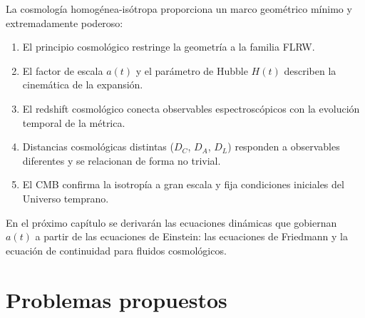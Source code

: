 La cosmología homogénea-isótropa proporciona un marco geométrico mínimo y extremadamente poderoso:
\begin{enumerate}[leftmargin=2em, label=\textbf{\arabic*.}]
  \item El principio cosmológico restringe la geometría a la familia FLRW.
  \item El factor de escala $a(t)$ y el parámetro de Hubble $H(t)$ describen la cinemática de la expansión.
  \item El redshift cosmológico conecta observables espectroscópicos con la evolución temporal de la métrica.
  \item Distancias cosmológicas distintas ($D_C$, $D_A$, $D_L$) responden a observables diferentes y se relacionan de forma no trivial.
  \item El CMB confirma la isotropía a gran escala y fija condiciones iniciales del Universo temprano.
\end{enumerate}

En el próximo capítulo se derivarán las ecuaciones dinámicas que gobiernan $a(t)$ a partir de las ecuaciones de Einstein: las ecuaciones de Friedmann y la ecuación de continuidad para fluidos cosmológicos.

\section*{Problemas propuestos}

